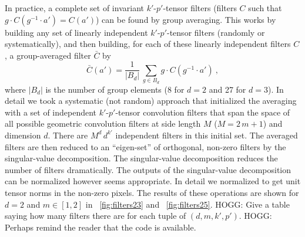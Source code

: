 \documentclass{article}
\theoremstyle{plain}
\newcommand{\figref}[1]{\figurename~\ref{#1}}
\begin{document}
In practice, a complete set of invariant $k'$-$p'$-tensor filters (filters $C$ such that $g\cdot C(g^{-1} \cdot a') = C(a')$) can be found by group averaging.
This works by building any set of linearly independent $k'$-$p'$-tensor filters (randomly or systematically), and then building, for each of these linearly independent filters $C$, a group-averaged filter $\bar{C}$ by
\begin{equation}
    \bar{C}(a') = \frac{1}{|B_d|}\,\sum_{g\in B_d} g\cdot C(g^{-1}\cdot a') ~,
\end{equation}
where $|B_d|$ is the number of group elements (8 for $d=2$ and 27 for $d=3$).
In detail we took a systematic (not random) approach that initialized the averaging with a set of independent $k'$-$p'$-tensor convolution filters that span the space of all possible geometric convolution filters at side length $M$ ($M=2\,m+1$) and dimension $d$.
There are $M^d\,d^{k'}$ independent filters in this initial set.
The averaged filters are then reduced to an ``eigen-set'' of orthogonal, non-zero filters by the singular-value decomposition.
The singular-value decomposition reduces the number of filters dramatically.
The outputs of the singular-value decomposition can be normalized however seems appropriate.
In detail we normalized to get unit tensor norms in the non-zero pixels.
The results of these operations are shown for $d=2$ and $m\in[1, 2]$ in \figref{fig:filters23} and \figref{fig:filters25}.
HOGG: Give a table saying how many filters there are for each tuple of $(d,m,k',p')$.
HOGG: Perhaps remind the reader that the code is available.
\end{document}
